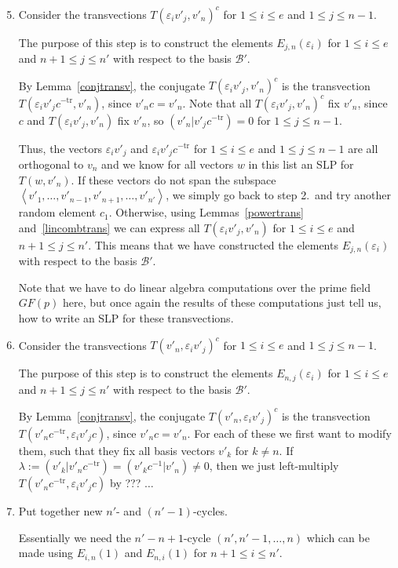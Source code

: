 \documentclass[a4paper,11pt]{article}
\newcommand{\tr}{\mathrm{tr}}
\newcommand{\B}{\mathcal{B}}
\begin{document}
\begin{enumerate}
\setcounter{enumi}{4}
\item Consider the transvections $T(\varepsilon_i v'_j,v'_n)^c$ 
for $1 \le i \le e$ and $1 \le j \le n-1$.

The purpose of this step is to construct the elements
$E_{j,n}(\varepsilon_i)$ for $1 \le i \le e$ and $n+1 \le j \le n'$
with respect to the basis $\B'$.

By Lemma~\ref{conjtransv}, 
the conjugate $T(\varepsilon_i v'_j,v'_n)^c$ is the transvection
$T(\varepsilon_i v'_j c^{-\tr},v'_n)$,
since $v'_nc = v'_n$. Note that all
$T(\varepsilon_i v'_j,v'_n)^c$ fix $v'_n$, since $c$ and
$T(\varepsilon_i v'_j,v'_n)$ fix $v'_n$, so $(v'_n|v'_jc^{-\tr}) = 0$ 
for $1 \le j \le n-1$.

Thus, the vectors $\varepsilon_i v'_j$ and $\varepsilon_i v'_j c^{-\tr}$
for $1 \le i \le e$ and $1 \le j \le n-1$
are all orthogonal to $v_n$ and we know for all 
vectors $w$ in this list an SLP for $T(w,v'_n)$.
If these vectors do not span the subspace
$\left< v'_1, \ldots, v'_{n-1}, v'_{n+1}, \ldots, v'_{n'}\right>$, we
simply go back to step 2.~and try another random element $c_1$.
Otherwise, using Lemmas~\ref{powertrans} and~\ref{lincombtrans} we
can express all $T(\varepsilon_i v'_j,v'_n)$ for $1 \le i \le e$ and
$n+1 \le j \le n'$. This means that we have constructed the elements
$E_{j,n}(\varepsilon_i)$ with respect to the basis $\B'$.

Note that we have to do linear algebra computations 
over the prime field $GF(p)$ here,
but once again the results of these computations just tell us, how 
to write an SLP for these transvections.

\item Consider the transvections $T(v'_n,\varepsilon_i v'_j)^c$ for
$1 \le i \le e$ and $1 \le j \le n-1$.

The purpose of this step is to construct the elements
$E_{n,j}(\varepsilon_i)$ for $1 \le i \le e$ and $n+1 \le j \le n'$
with respect to the basis $\B'$.

By Lemma~\ref{conjtransv}, 
the conjugate $T(v'_n,\varepsilon_i v'_j)^c$ is the transvection
$T(v'_n c^{-\tr},\varepsilon_i v'_j c)$,
since $v'_nc = v'_n$. For each of these we first want to modify them,
such that they fix all basis vectors $v'_k$ for $k \neq n$. If
$\lambda := (v'_k | v'_n c^{-\tr}) = (v'_k c^{-1} | v'_n) \neq 0$, then
we just left-multiply $T(v'_n c^{-\tr},\varepsilon_i v'_j c)$ by
??? $\ldots$

\item Put together new $n'$- and $(n'-1)$-cycles.

Essentially we need the $n'-n+1$-cycle $(n',n'-1, \ldots, n)$ which can 
be made using $E_{i,n}(1)$ and $E_{n,i}(1)$ for $n+1 \le i \le n'$.
\end{enumerate}
\end{document}
